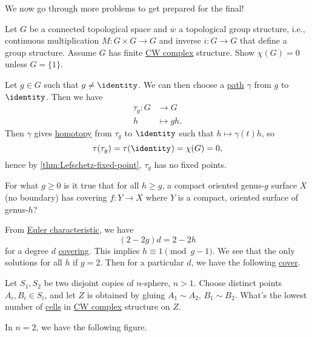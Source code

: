 We now go through more problems to get prepared for the final!
\begin{exercise}[QR Jan. 2021]
	Let \(G\) be a connected topological space and \(\overline{w} \) a topological group structure, i.e., continuous multiplication
	\(M\colon G\times G \to G\) and inverse \(i\colon G\to G\) that define a group structure. Assume \(G\) has finite \hyperref[def:CW-Complex]{CW complex}
	structure. Show \(\chi (G) = 0\) unless \(G = \{1\}\).
\end{exercise}
\begin{answer}
	Let \(g\in G\) such that \(g \neq \identity_{} \). We can then choose a \hyperref[def:path]{path} \(\gamma \) from \(g\) to \(\identity_{} \).
	Then we have
	\[
		\begin{split}
			\tau _g\colon G &\to G\\
			h &\mapsto gh.
		\end{split}
	\]
	Then \(\gamma \) gives \hyperref[def:homotopy]{homotopy} from \(\tau _g\) to \(\identity_{} \) such that \(h \mapsto \gamma (t) h\),
	so
	\[
		\tau (\tau _{g} )= \tau (\identity_{} )= \chi (G) = 0,
	\]
	hence by \autoref{thm:Lefschetz-fixed-point}, \(\tau _g\) has no fixed points.
\end{answer}

\begin{exercise}[QR May 2019]
	For what \(g \geq 0\) is it true that for all \(h \geq g\), a compact oriented genus-\(g\) surface \(X\) (no boundary)
	has covering \(f\colon Y\to X\) where \(Y\) is a compact, oriented surface of genus-\(h\)?
\end{exercise}
\begin{answer}
	From \hyperref[def:Euler-characteristic]{Euler characteristic}, we have
	\[
		(2 - 2g) d = 2 - 2h
	\]
	for a degree \(d\) \hyperref[def:covering-space]{covering}. This implies \(h \equiv 1\pmod {g-1}\). We see that the only solutions
	for all \(h\) if \(g = 2\). Then for a particular \(d\), we have the following \hyperref[def:covering-space]{cover}.
	\begin{figure}[H]
		\centering
		\label{fig:lec-41-2}
	\end{figure}
\end{answer}

\begin{exercise}[QR Jan. 2019]
	Let \(S_1, S_2\) be two disjoint  copies of \(n\)-sphere, \(n>1\). Choose distinct points \(A_{i} , B_{i} \in S_{i} \), and let
	\(Z\) is obtained by gluing \(A_1\sim A_2\), \(B_1\sim B_2\). What's the lowest number of \hyperref[def:cell]{cells} in
	\hyperref[def:CW-Complex]{CW complex} structure on \(Z\).
\end{exercise}
\begin{answer}
	In \(n=2\), we have the following figure.
	\begin{figure}[H]
		\centering
		\label{fig:lec-41-3}
	\end{figure}
\end{answer}

